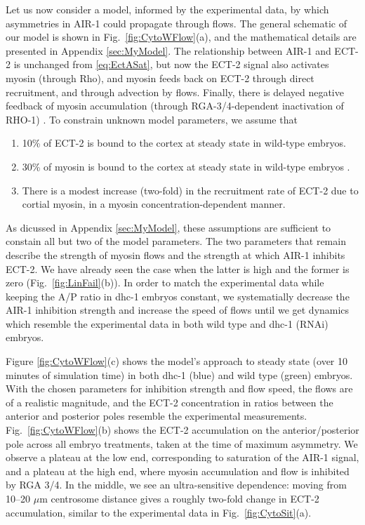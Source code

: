 \documentclass[11pt]{article}
\begin{document}
Let us now consider a model, informed by the experimental data, by which asymmetries in AIR-1 could propagate through flows. The general schematic of our model is shown in Fig.\ \ref{fig:CytoWFlow}(a), and the mathematical details are presented in Appendix \ref{sec:MyModel}. The relationship between AIR-1 and ECT-2 is unchanged from \ref{eq:EctASat}, but now the ECT-2 signal also activates myosin (through Rho), and myosin feeds back on ECT-2 through direct recruitment, and through advection by flows. Finally, there is delayed negative feedback of myosin accumulation (through RGA-3/4-dependent inactivation of RHO-1) \cite{michaux2018excitable}. To constrain unknown model parameters, we assume that 
\begin{enumerate}
\item 10\% of ECT-2 is bound to the cortex at steady state in wild-type embryos. 
\item 30\% of myosin is bound to the cortex at steady state in wild-type embryos \cite[Fig.~S3j]{gross2019guiding}.
\item There is a modest increase (two-fold) in the recruitment rate of ECT-2 due to cortial myosin, in a myosin concentration-dependent manner.
\end{enumerate}
As dicussed in Appendix \ref{sec:MyModel}, these assumptions are sufficient to constain all but two of the model parameters. The two parameters that remain describe the strength of myosin flows and the strength at which AIR-1 inhibits ECT-2. We have already seen the case when the latter is high and the former is zero (Fig.\ \ref{fig:LinFail}(b)). In order to match the experimental data while keeping the A/P ratio in dhc-1 embryos constant, we systematially decrease the AIR-1 inhibition strength and increase the speed of flows until we get dynamics which resemble the experimental data in both wild type and dhc-1 (RNAi) embryos. 

Figure \ref{fig:CytoWFlow}(c) shows the model's approach to steady state (over 10 minutes of simulation time) in both dhc-1 (blue) and wild type (green) embryos. With the chosen parameters for inhibition strength and flow speed, the flows are of a realistic magnitude, and the ECT-2 concentration in ratios between the anterior and posterior poles resemble the experimental measurements. Fig.\ \ref{fig:CytoWFlow}(b) shows the ECT-2 accumulation on the anterior/posterior pole across all embryo treatments, taken at the time of maximum asymmetry. We observe a plateau at the low end, corresponding to saturation of the AIR-1 signal, and a plateau at the high end, where myosin accumulation and flow is inhibited by RGA 3/4. In the middle, we see an ultra-sensitive dependence: moving from 10--20 $\mu$m centrosome distance gives a roughly two-fold change in ECT-2 accumulation, similar to the experimental data in Fig.\ \ref{fig:CytoSit}(a). 
\end{document}
